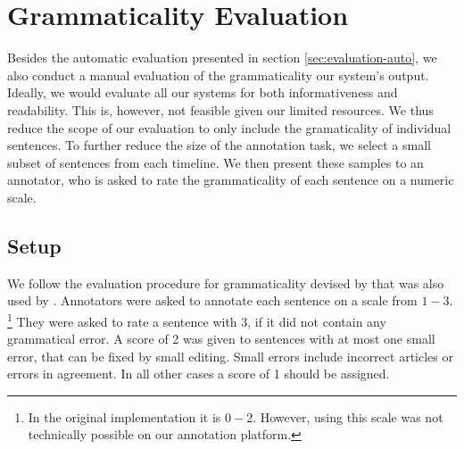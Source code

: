 \documentclass[a4paper,BCOR=10mm]{report}
\numberwithin{lemma}{chapter}
\numberwithin{definition}{chapter}
\begin{document}
%

\chapter{Grammaticality Evaluation} \label{sec:results-manual}

Besides the automatic evaluation presented in section \ref{sec:evaluation-auto}, we also conduct a manual evaluation of the grammaticality our system's output.
Ideally, we would evaluate all our systems for both informativeness and readability. This is, however, not feasible given our limited resources.
We thus reduce the scope of our evaluation to only include the gramaticality of individual sentences.
To further reduce the size of the annotation task, we select a small subset of sentences from each timeline.
We then present these samples to an annotator, who is asked to rate the grammaticality of each sentence on a numeric scale.

\section{Setup}

We follow the evaluation procedure for grammaticality devised by \citet{mckeown} that was also used by \citet{filippova}.
Annotators were asked to annotate each sentence on a scale from $1-3$. \footnote{In the original implementation it is $0-2$. However, using this scale was not technically possible on our annotation platform.} They were asked to rate a sentence with 3, if it did not contain any grammatical error. A score of 2 was given to sentences with at most one small error, that can be fixed by small editing. Small errors include incorrect articles or errors in agreement. In all other cases a score of 1 should be assigned.
\end{document}
